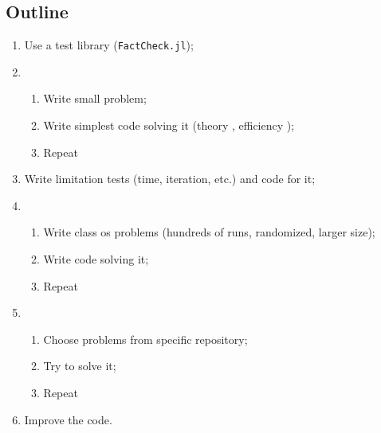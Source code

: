 

\subsection{Outline}

\begin{frame}[t,fragile]
  \begin{enumerate}
    \setlength{\itemsep}{0pt}
    \item<1-> Use a test library (\texttt{FactCheck.jl});
    \item<2->
    \begin{enumerate}
      \item Write small problem;
      \item Write simplest code solving it (theory \yes, efficiency \no);
      \item Repeat
    \end{enumerate}
    \item<3-> Write limitation tests (time, iteration, etc.) and code for it;
    \item<4->
    \begin{enumerate}
      \item Write class os problems (hundreds of runs, randomized, larger size);
      \item Write code solving it;
      \item Repeat
    \end{enumerate}
    \item<5->
    \begin{enumerate}
      \item Choose problems from specific repository;
      \item Try to solve it;
      \item Repeat
    \end{enumerate}
    \item<6-> Improve the code.
  \end{enumerate}
\end{frame}

